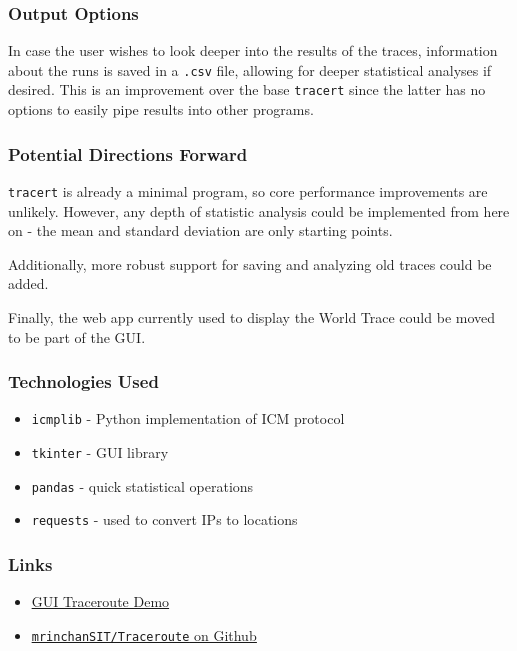 \documentclass{beamer}
\begin{document}
\begin{frame}

\frametitle{Output Options}

In case the user wishes to look deeper into the results of the traces,
information about the runs is saved in a \texttt{.csv} file, allowing
for deeper statistical analyses if desired. This is an improvement over 
the base \texttt{tracert} since the latter has no options to easily pipe
results into other programs.

\end{frame}

\begin{frame}
  \frametitle{Potential Directions Forward}

  \texttt{tracert} is already a minimal program, so core performance improvements
  are unlikely. However, any depth of statistic analysis could be implemented 
  from here on - the mean and standard deviation are only starting points.

  Additionally, more robust support for saving and analyzing old traces could be added.

  Finally, the web app currently used to display the World Trace could be moved
  to be part of the GUI.

\end{frame}

\begin{frame}
  \frametitle{Technologies Used}

\begin{itemize}
  \item \texttt{icmplib} - Python implementation of ICM protocol
  \item \texttt{tkinter} - GUI library
  \item \texttt{pandas} - quick statistical operations
  \item \texttt{requests} - used to convert IPs to locations
\end{itemize}

\end{frame}

\begin{frame}
  \frametitle{Links}

  \begin{itemize}
  \item \href{https://youtu.be/I2BpqN5PpAU}{\underline{GUI Traceroute Demo}}
  \item \href{http://github.com/mrinchanSIT/Traceroute}{\underline{\texttt{mrinchanSIT/Traceroute} on Github}}
  \end{itemize}
\end{frame}
\end{document}
